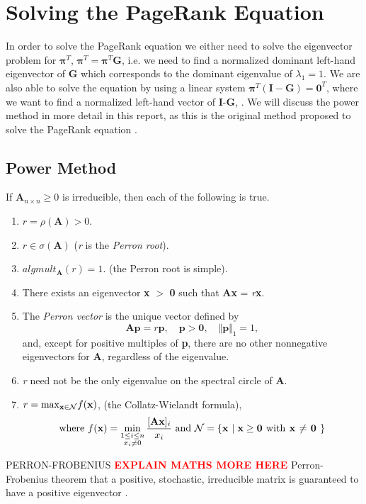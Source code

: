 \documentclass[11pt]{report}
\begin{document}
\section{Solving the PageRank Equation} \label{sec:solve}
In order to solve the PageRank equation we either need to solve the eigenvector problem for $\boldsymbol{\pi}^T$, \(\boldsymbol{\pi}^T = \boldsymbol{\pi}^T\textbf{G}\), i.e. we need to find a normalized dominant left-hand eigenvector of \textbf{G} which corresponds to the dominant eigenvalue of $\lambda_1 = 1$. We are also able to solve the equation by using a linear system \(\boldsymbol{\pi}^T(\textbf{I}-\textbf{G})=\textbf{0}^T\), where we want to find a normalized left-hand vector of \textbf{I}-\textbf{G}, \cite{langville}. We will discuss the power method in more detail in this report, as this is the original method proposed to solve the PageRank equation \cite{langville}.

\subsection{Power Method} \label{sec:power}
\begin{theorem} \normalfont
If \(\textbf{A}_{n \times n} \geq 0\) is irreducible, then each of the following is true.
\begin{enumerate}
\item $r = \rho(\textbf{A}) > 0$.
\item $r \in \sigma (\textbf{A}) $ (\textit{r} is the \textit{Perron root}).
\item $alg mult_\textbf{A}(r) = 1$. (the Perron root is simple).
\item There exists an eigenvector \textbf{x} $>$ \textbf{0} such that \textbf{Ax} = \textit{r}\textbf{x}.
\item The \textit{Perron vector} is the unique vector defined by 
\[\textbf{Ap}=r\textbf{p}, \quad \textbf{p}>\textbf{0}, \quad \Vert \textbf{p} \Vert _1 = 1, \] and, except for positive multiples of \textbf{p}, there are no other nonnegative eigenvectors for \textbf{A}, regardless of the eigenvalue.
\item \textit{r} need not be the only eigenvalue on the spectral circle of \textbf{A}.
\item \(r=\textnormal{max}_{\textbf{x}\in \mathcal{N}} f(\textbf{x})\), (the Collatz-Wielandt formula), 
\begin{equation*}
\textnormal{where } f(\textbf{x}) = \min_{\substack{1\leq i \leq n \\ x_i \neq 0}} \frac{[\textbf{Ax}]_i}{x_i} \textnormal{ and } \mathcal{N} = \{ \textbf{x $\mid \textbf{x} \geq \textbf{0} $ \textnormal{with} \textbf{x} $\neq$ \textbf{0} } \}
\end{equation*}

\end{enumerate}

\end{theorem} \label{thm:P-F}
PERRON-FROBENIUS \cite{meyer2000matrix}  \cite{gallager1992discrete} 
\textcolor{red}{\textbf{EXPLAIN MATHS MORE HERE}} Perron-Frobenius theorem that a positive, stochastic, irreducible matrix is guaranteed to have a positive eigenvector \cite{thorson2004modeling}.
\end{document}
